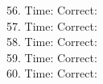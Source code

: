 \documentclass[12pt, letterpaper]{article}
\begin{document}
\begin{multicols}{2}
{56. Time: \underline{\hspace{6em}}\quad Correct: \underline{\hspace{3em}}\\
57. Time: \underline{\hspace{6em}}\quad Correct: \underline{\hspace{3em}}\\
58. Time: \underline{\hspace{6em}}\quad Correct: \underline{\hspace{3em}}\\
59. Time: \underline{\hspace{6em}}\quad Correct: \underline{\hspace{3em}}\\
60. Time: \underline{\hspace{6em}}\quad Correct: \underline{\hspace{3em}}\par
}
\end{multicols}
\newpage
\end{document}
